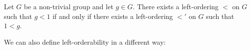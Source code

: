 \begin{fact} Let $G$ be a non-trivial group and let $g\in{}G$. There exists a left-ordering $<$ on $G$ such that $g<1$ if and only if there exists a left-ordering $<'$ on $G$ such that $1<g$.
\label{fact:WLOG}
\end{fact}

\noindent{}We can also define left-orderability in a different way:

